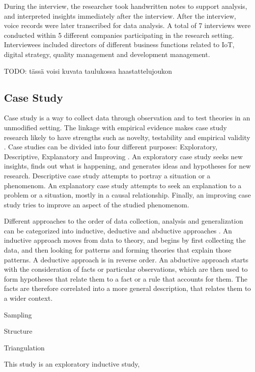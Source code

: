 During the interview, the researcher took handwritten notes to support analysis, and interpreted insights immediately after the interview. After the interview, voice records were later transcribed for data analysis. A total of 7 interviews were conducted within 5 different companies participating in the research setting. Interviewees included directors of different business functions related to IoT, digital strategy, quality management and development management.

TODO: tässä voisi kuvata taulukossa haastattelujoukon

\subsection{Case Study}
Case study is a way to collect data through observation and to test theories in an unmodified setting. The linkage with empirical evidence makes case study research likely to have strengths such as novelty, testability and empirical validity \cite{eisenhardt1989building}. Case studies can be divided into four different purposes: Exploratory, Descriptive, Explanatory and Improving \cite{robson2016real}. An exploratory case study seeks new insights, finds out what is happening, and generates ideas and hypotheses for new research. Descriptive case study attempts to portray a situation or a phenomenom. An explanatory case study attempts to seek an explanation to a problem or a situation, mostly in a causal relationship. Finally, an improving case study tries to improve an aspect of the studied phenomenom.

Different approaches to the order of data collection, analysis and generalization can be categorized into inductive, deductive and abductive approaches \cite{dubois2002systematic}. An inductive approach moves from data to theory, and begins by first collecting the data, and then looking for patterns and forming theories that explain those patterns. A deductive approach is in reverse order. An abductive approach starts with the consideration of facts or particular observations, which are then used to form hypotheses that relate them to a fact or a rule that accounts for them. The facts are therefore correlated into a more general description, that relates them to a wider context.

Sampling

Structure \cite{eisenhardt1989building}

Triangulation

This study is an exploratory inductive study, 

